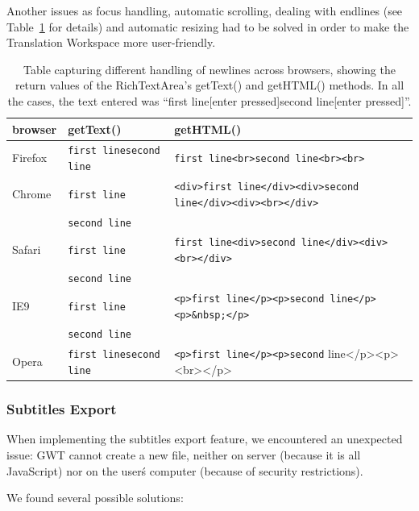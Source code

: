 {Another issues as focus handling, automatic scrolling, dealing with endlines (see Table~\ref{implprocess:RichTextAreaNewlines} for details) and automatic resizing had to be solved in order to make the Translation Workspace more user-friendly.

\begin{table}[h]
\begin{center}
\begin{tabular}{|l|l|l|}
\hline
browser & getText()             & getHTML() \\
\hline
Firefox & \verb=first linesecond line= & \verb=first line<br>second line<br><br>= \\
\hline
Chrome  & \verb=first line=            & \verb=<div>first line</div><div>second line</div><div><br></div>= \\
        & \verb=second line=           & \\ 
\hline
Safari  & \verb=first line=            & \verb=first line<div>second line</div><div><br></div>= \\
        & \verb=second line=           & \\
\hline
IE9     & \verb=first line=            & \verb=<p>first line</p><p>second line</p><p>&nbsp;</p>= \\
        & \verb=second line=           & \\
\hline
Opera   & \verb=first linesecond line= & \verb=<p>first line</p><p>second= line</p><p><br></p> \\
\hline
\end{tabular}
\end{center}
\caption{Table capturing different handling of newlines across browsers, showing the return values of the RichTextArea's getText() and getHTML() methods. In all the cases, the text entered was ``first line[enter pressed]second line[enter pressed]''.}\label{implprocess:RichTextAreaNewlines}
\end{table}

\subsubsection{Subtitles Export}

When implementing the subtitles export feature, we encountered an unexpected issue:
GWT cannot create a new file, neither on server (because it is all JavaScript) nor on the user\'s computer (because of security restrictions).

We found several possible solutions:

}
